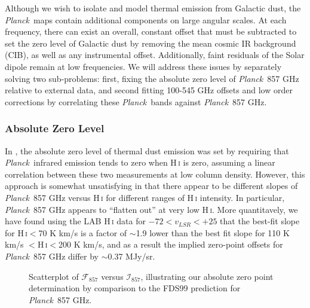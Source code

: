 \documentclass{emulateapj}
\newcommand{\PLANCK}{{\it Planck}}
\begin{document}


Although we wish to isolate and model thermal emission from Galactic dust, the
\PLANCK~maps contain additional components on large angular scales. At each 
frequency, there can exist an overall, constant offset that must be subtracted 
to set the zero level of Galactic dust by removing the mean cosmic IR 
background (CIB), as well as any instrumental offset. Additionally, faint 
residuals of the Solar dipole remain at low frequencies. We will address these 
issues by separately solving two sub-problems: first, fixing the absolute zero 
level of \PLANCK~857 GHz relative to external data, and second fitting 
100-545 GHz offsets and low order corrections by correlating these 
\PLANCK~bands against \PLANCK~857 GHz.

\subsubsection{Absolute Zero Level}
\label{sec:zp_abs}
In \cite{planckdust}, the absolute zero level of thermal dust emission was set 
by requiring that \PLANCK~infrared emission tends to zero when H\,\textsc{i} is
zero, assuming a linear correlation between these two measurements at low 
column density. However, this approach is somewhat unsatisfying in that there 
appear to be different slopes of \PLANCK~857 GHz versus H\,\textsc{i} for 
different ranges of H\,\textsc{i} intensity. In particular, \PLANCK~857 GHz 
appears to ``flatten out'' at very low H\,\textsc{i}. More quantitavely, we 
have found using the LAB H\,\textsc{i} data \citep{lab} for 
$-72$$<$$v_{LSR}$$<$$+25$ that the best-fit slope for H\,\textsc{i}$<$70 K km/s
is a factor of $\sim$1.9 lower than the best fit slope for 110 K km/s 
$<$H\,\textsc{i}$<$200 K km/s, and as a result the implied zero-point offsets 
for \PLANCK~857 GHz differ by $\sim$0.37 MJy/sr.


\begin{figure}
\begin{center}
\caption{\label{fig:fdsref} Scatterplot of $\mathcal{F}_{857}$ versus 
$\mathcal{I}_{857}$, illustrating our absolute zero point determination by
comparison to the FDS99 prediction for \PLANCK~857 GHz.}
\end{center}
\end{figure}
\end{document}
